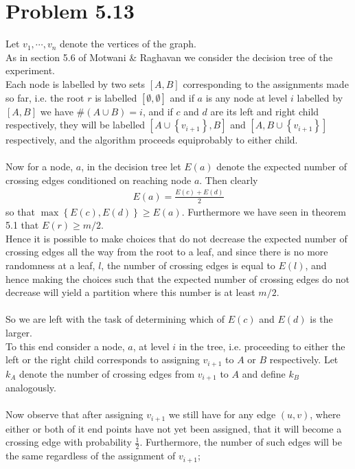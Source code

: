 \section*{Problem 5.13}
Let $v_1,\cdots,v_n$ denote the vertices of the graph. \\
As in section 5.6 of Motwani \& Raghavan we consider the decision tree of the experiment. \\
Each node is labelled by two sets $[A,B]$ corresponding to the assignments made so far,
i.e. the root $r$ is labelled $[\emptyset, \emptyset]$ 
and if $a$ is any node at level $i$ labelled by $[A,B]$ we have $\# (A \cup B)=i$,
and if $c$ and $d$ are its left and right child respectively, they will be labelled
$[A \cup \left\{ v_{i+1} \right\}, B]$ and $[A, B \cup \left\{ v_{i+1} \right\}]$ respectively,
and the algorithm proceeds equiprobably to either child. \\ \\
Now for a node, $a$, in the decision tree let $E(a)$ denote the expected number of crossing edges
conditioned on reaching node $a$. Then clearly 
\begin{align*}
	E(a)=\frac{E(c)+E(d)}{2}
\end{align*}
so that $\max\left\{ E(c), E(d) \right\} \geq E(a)$.
Furthermore we have seen in theorem 5.1 that $E(r) \geq m/2$. \\
Hence it is possible to make choices that do not decrease the expected number of crossing edges
all the way from the root to a leaf, 
and since there is no more randomness at a leaf, $l$, the number of crossing edges is equal to $E(l)$,
and hence making the choices such that the expected number of crossing edges do not decrease
will yield a partition where this number is at least $m/2$. \\ \\
So we are left with the task of determining which of $E(c)$ and $E(d)$ is the larger. \\
To this end consider a node, $a$, at level $i$ in the tree, 
i.e. proceeding to either the left or the right child corresponds to assigning
$v_{i+1}$ to $A$ or $B$ respectively. Let $k_A$ denote the number of crossing edges from
$v_{i+1}$ to $A$ and define $k_B$ analogously. \\ \\
Now observe that after assigning $v_{i+1}$
we still have for any edge $(u,v)$, where either or both of it end points have not yet been assigned,
that it will become a crossing edge with probability $\frac{1}{2}$.
Furthermore, the number of such edges will be the same regardless of the assignment of $v_{i+1}$; 
